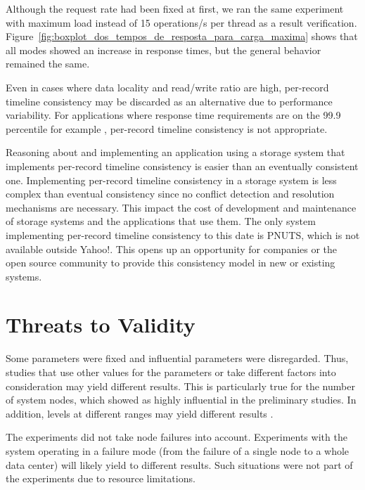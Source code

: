 \documentclass[man,floatsintext,12pt]{apa6}
\begin{document}
Although the request rate had been fixed at first, we ran the same experiment
with maximum load instead of 15 operations/s per thread as a result
verification. Figure~\ref{fig:boxplot_dos_tempos_de_resposta_para_carga_maxima}
shows that all modes showed an increase in response times, but the general
behavior remained the same.

Even in cases where data locality and read/write ratio are high, per-record
timeline consistency may be discarded as an alternative due to performance
variability. For applications where response time requirements are on the 99.9
percentile for example \parencite{DeCandia2007}, per-record timeline consistency
is not appropriate.

Reasoning about and implementing an application using a storage system that
implements per-record timeline consistency is easier than an eventually
consistent one. Implementing per-record timeline consistency in a storage
system is less complex than eventual consistency since no conflict detection
and resolution mechanisms are necessary. This impact the cost of development
and maintenance of storage systems and the applications that use them. The only
system implementing per-record timeline consistency to this date is PNUTS,
which is not available outside Yahoo!. This opens up an opportunity for
companies or the open source community to provide this consistency model in new
or existing systems.

\label{threats_to_validity}
\section{Threats to Validity}

Some parameters were fixed and influential parameters were disregarded. Thus,
studies that use other values for the parameters or take different factors into
consideration may yield different results. This is particularly true for the
number of system nodes, which showed as highly influential in the preliminary
studies. In addition, levels at different ranges may yield different results
\parencite{Jain1991}.

The experiments did not take node failures into account. Experiments with the
system operating in a failure mode (from the failure of a single node to a
whole data center) will likely yield to different results. Such situations were
not part of the experiments due to resource limitations.
\end{document}
